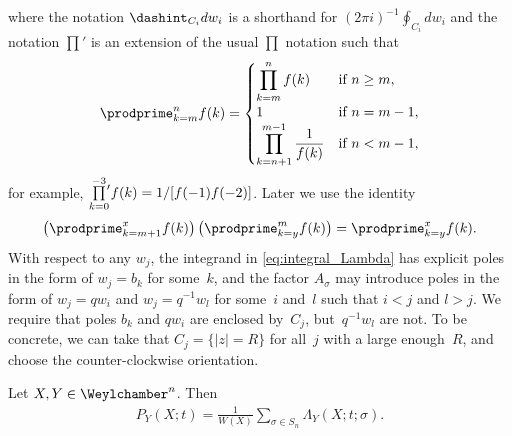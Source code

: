 where the notation $\dashint_{C_i} dw_i$ is a shorthand for $(2\pi i)^{-1} \oint_{C_i} dw_i$ and the notation $\prod'$ is an extension of the usual $\prod$ notation such that
\begin{gather*}
 \prodprime^n_{k = m} f(k) =
 \begin{cases}
 \displaystyle \prod^n_{k = m} f(k) & \text{if $n \geq m$}, \\
 1 & \text{if $n = m - 1$}, \\
\displaystyle \prod^{m - 1}_{k = n + 1} \frac{1}{f(k)} & \text{if $n < m - 1$},
 \end{cases}
\end{gather*}
for example, %
 $\prod\limits^{-3}_{k = 0}\!\!{\vphantom{\prod}}' f(k) = 1/[f(-1) f(-2)]$. Later we use the identity
\begin{gather*}
 \left( \prodprime^x_{k = m + 1} f(k) \right) \left( \prodprime^m_{k = y} f(k) \right) = \prodprime^x_{k = y} f(k).
\end{gather*}
With respect to any $w_j$, the integrand in \eqref{eq:integral_Lambda} has explicit poles in the form of $w_j = b_k$ for some~$k$, and the factor $A_{\sigma}$ may introduce poles in the form of $w_j = q w_i$ and $w_j = q^{-1} w_l$ for some~$i$ and~$l$ such that $i < j$ and $l > j$. We require that poles $b_k$ and $q w_i$ are enclosed by~$C_j$, but~$q^{-1} w_l$ are not. To be concrete, we can take that $C_j = \{ \lvert z \rvert = R \}$ for all~$j$ with a large enough~$R$, and choose the counter-clockwise orientation.
\begin{Theorem} \label{thm:main}
 Let $X, Y \in \Weylchamber^n$. Then
 \begin{gather} \label{eq:main_result}
 P_Y(X; t) = \frac{1}{W(X)} \sum_{\sigma \in S_n} \Lambda_Y(X; t; \sigma).
 \end{gather}
\end{Theorem}
